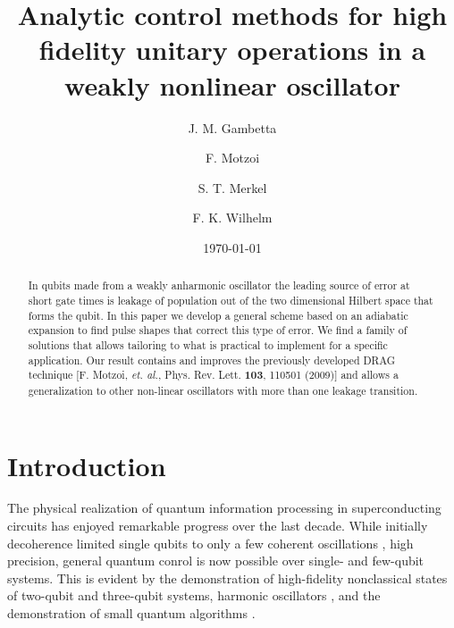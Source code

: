 \documentclass[pra,twocolumn,floatfix,superscriptaddress,eqsecnum]{revtex4-1}
\begin{document}
\normalem

\title{Analytic control methods for high fidelity unitary operations in a weakly nonlinear oscillator}
\date{\today}
\author{J. M. Gambetta}
\author{F. Motzoi}
\author{S. T. Merkel}
\author{F. K. Wilhelm}

\begin{abstract}
In qubits made from a weakly anharmonic oscillator the leading source of error at short gate times is leakage of population out of the two dimensional Hilbert space that forms the qubit. In this paper we develop a general scheme based on an adiabatic expansion to find pulse shapes that correct this type of error. We find a family of solutions that allows tailoring to what is practical to implement for a specific application.  Our result contains and improves the previously developed DRAG technique [F. Motzoi, \emph{et. al.}, Phys. Rev. Lett. \textbf{103}, 110501 (2009)] and allows a generalization to other non-linear oscillators with more than one leakage transition.
\end{abstract}
\maketitle

\section{Introduction}
The physical realization of quantum information processing in
superconducting circuits \cite{Makhlin2001,You2003,Insight,Schoelkopf2008} has enjoyed
remarkable progress over the last decade. While initially decoherence limited single qubits to only a few coherent oscillations \cite{Nakamura1999}, high precision, general quantum conrol is now possible over single- and few-qubit systems.
This is evident by the demonstration of high-fidelity nonclassical states of
two-qubit \cite{Steffen2006,Ansmann2009,DiCarlo2009,Chow2010} and three-qubit \cite{DiCarlo2010,Neeley2010} systems, harmonic oscillators \cite{Hofheinz2009}, and the demonstration of small quantum algorithms \cite{DiCarlo2009}.
\end{document}
